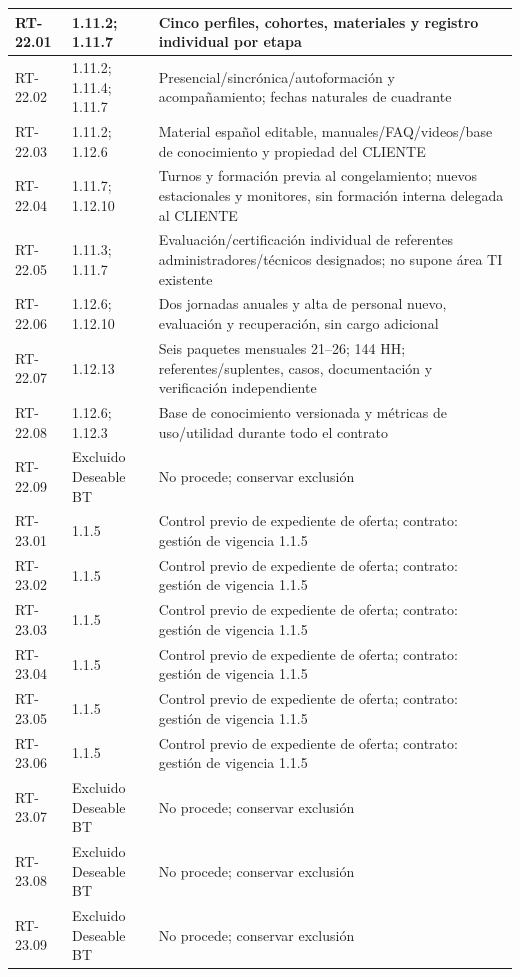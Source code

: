 \begin{longtable}{L{23mm}L{46mm}L{72mm}}
RT-22.01 & 1.11.2; 1.11.7 & Cinco perfiles, cohortes, materiales y registro individual por etapa\\\hline
RT-22.02 & 1.11.2; 1.11.4; 1.11.7 & Presencial/sincrónica/autoformación y acompañamiento; fechas naturales de cuadrante\\\hline
RT-22.03 & 1.11.2; 1.12.6 & Material español editable, manuales/FAQ/videos/base de conocimiento y propiedad del CLIENTE\\\hline
RT-22.04 & 1.11.7; 1.12.10 & Turnos y formación previa al congelamiento; nuevos estacionales y monitores, sin formación interna delegada al CLIENTE\\\hline
RT-22.05 & 1.11.3; 1.11.7 & Evaluación/certificación individual de referentes administradores/técnicos designados; no supone área TI existente\\\hline
RT-22.06 & 1.12.6; 1.12.10 & Dos jornadas anuales y alta de personal nuevo, evaluación y recuperación, sin cargo adicional\\\hline
RT-22.07 & 1.12.13 & Seis paquetes mensuales 21--26; 144 HH; referentes/suplentes, casos, documentación y verificación independiente\\\hline
RT-22.08 & 1.12.6; 1.12.3 & Base de conocimiento versionada y métricas de uso/utilidad durante todo el contrato\\\hline
RT-22.09 & Excluido Deseable BT & No procede; conservar exclusión\\\hline
RT-23.01 & 1.1.5 & Control previo de expediente de oferta; contrato: gestión de vigencia 1.1.5\\\hline
RT-23.02 & 1.1.5 & Control previo de expediente de oferta; contrato: gestión de vigencia 1.1.5\\\hline
RT-23.03 & 1.1.5 & Control previo de expediente de oferta; contrato: gestión de vigencia 1.1.5\\\hline
RT-23.04 & 1.1.5 & Control previo de expediente de oferta; contrato: gestión de vigencia 1.1.5\\\hline
RT-23.05 & 1.1.5 & Control previo de expediente de oferta; contrato: gestión de vigencia 1.1.5\\\hline
RT-23.06 & 1.1.5 & Control previo de expediente de oferta; contrato: gestión de vigencia 1.1.5\\\hline
RT-23.07 & Excluido Deseable BT & No procede; conservar exclusión\\\hline
RT-23.08 & Excluido Deseable BT & No procede; conservar exclusión\\\hline
RT-23.09 & Excluido Deseable BT & No procede; conservar exclusión\\\hline

\end{longtable}
